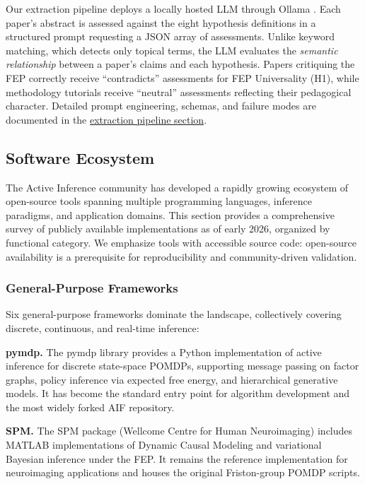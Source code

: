 \documentclass[
  english,
]{article}
\begin{document}
{{{{{{{{{{{{{{{{Our extraction pipeline deploys a locally hosted LLM through Ollama
\citep{ollama2024}. Each paper's abstract is assessed against the eight
hypothesis definitions in a structured prompt requesting a JSON array of
assessments. Unlike keyword matching, which detects only topical terms,
the LLM evaluates the \emph{semantic relationship} between a paper's
claims and each hypothesis. Papers critiquing the FEP correctly receive
``contradicts'' assessments for FEP Universality (H1), while methodology
tutorials receive ``neutral'' assessments reflecting their pedagogical
character. Detailed prompt engineering, schemas, and failure modes are
documented in the
\hyperref[sec:extraction_pipeline]{extraction pipeline section}.

\subsection{Software Ecosystem}\label{software-ecosystem}

The Active Inference community has developed a rapidly growing ecosystem
of open-source tools spanning multiple programming languages, inference
paradigms, and application domains. This section provides a
comprehensive survey of publicly available implementations as of early
2026, organized by functional category. We emphasize tools with
accessible source code: open-source availability is a prerequisite for
reproducibility and community-driven validation.

\subsubsection{General-Purpose
Frameworks}\label{general-purpose-frameworks}

Six general-purpose frameworks dominate the landscape, collectively
covering discrete, continuous, and real-time inference:

\textbf{pymdp.} The pymdp library \citep{heins2022pymdp} provides a
Python implementation of active inference for discrete state-space
POMDPs, supporting message passing on factor graphs, policy inference
via expected free energy, and hierarchical generative models. It has
become the standard entry point for algorithm development and the most
widely forked AIF repository.

\textbf{SPM.} The SPM package (Wellcome Centre for Human Neuroimaging)
includes MATLAB implementations of Dynamic Causal Modeling and
variational Bayesian inference under the FEP. It remains the reference
implementation for neuroimaging applications and houses the original
Friston-group POMDP scripts.

}}}}}}}}}}}}}}}}
\end{document}
